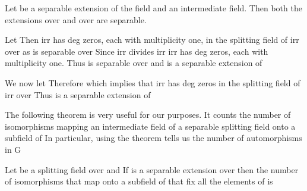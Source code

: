 \documentclass[11pt,oneside]{article}
\begin{document}
\begin{BookBody}
 Let  be a separable extension of the field  and  an intermediate field. Then both the extensions  over  and  over  are separable.

 Let  Then irr has deg zeros, each with multiplicity one, in the splitting field of irr over  as  is separable over  Since irr divides irr irr has deg zeros, each with multiplicity one. Thus \BookInline{\alpha } is separable over  and  is a separable extension of 

We now let  Therefore which implies that irr has deg zeros in the splitting field of irr over  Thus  is a separable extension of \BookEnd{\blacklozenge}

The following theorem is very useful for our purposes. It counts the number of isomorphisms mapping an intermediate field  of a separable splitting field  onto a subfield of  In particular, using  the theorem tells us the number of automorphisms in G

 Let  be a splitting field over  and  If  is a separable extension over  then the number of isomorphisms that map  onto a subfield of  that fix all the elements of  is 


\end{BookBody}
\end{document}
